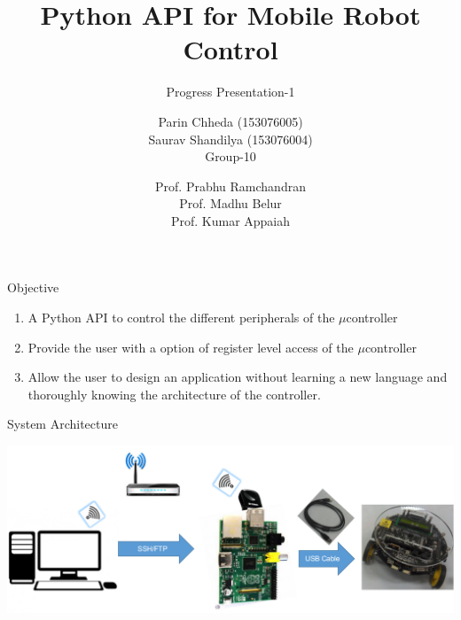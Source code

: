 \documentclass[10pt,handout,english]{beamer}
\title[] %
{Python API for Mobile Robot Control}
\subtitle{Progress Presentation-1}
\author[AE-663 Course Project ] %
{Parin Chheda (153076005) \\ Saurav Shandilya (153076004) \\ Group-10 }
\institute [Indian Institute of Technology Bombay]%
{
  
}
\date[\today] %
{Prof. Prabhu Ramchandran \\ Prof. Madhu Belur \\ Prof. Kumar Appaiah}
\begin{document}
 
\frame{\titlepage}

\begin{frame}{Objective}
\begin{enumerate}
	\item A Python API to control the different peripherals of the ${\mu}$controller
	\item Provide the user with a option of register level access of the ${\mu}$controller
	\item Allow the user to design an application without learning a new language and thoroughly knowing the architecture of the controller.
\end{enumerate}
\end{frame}

\begin{frame}{System Architecture}

\includegraphics[scale = 0.35]{system_diagram}

\end{frame}
\end{document}
